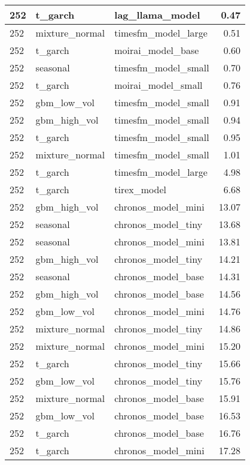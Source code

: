 {\begin{tabular}{lllr}
\midrule
252 & t\_garch & lag\_llama\_model & 0.47 \\
\midrule
252 & mixture\_normal & timesfm\_model\_large & 0.51 \\
\midrule
252 & t\_garch & moirai\_model\_base & 0.60 \\
\midrule
252 & seasonal & timesfm\_model\_small & 0.70 \\
\midrule
252 & t\_garch & moirai\_model\_small & 0.76 \\
\midrule
252 & gbm\_low\_vol & timesfm\_model\_small & 0.91 \\
\midrule
252 & gbm\_high\_vol & timesfm\_model\_small & 0.94 \\
\midrule
252 & t\_garch & timesfm\_model\_small & 0.95 \\
\midrule
252 & mixture\_normal & timesfm\_model\_small & 1.01 \\
\midrule
252 & t\_garch & timesfm\_model\_large & 4.98 \\
\midrule
252 & t\_garch & tirex\_model & 6.68 \\
\midrule
252 & gbm\_high\_vol & chronos\_model\_mini & 13.07 \\
\midrule
252 & seasonal & chronos\_model\_tiny & 13.68 \\
\midrule
252 & seasonal & chronos\_model\_mini & 13.81 \\
\midrule
252 & gbm\_high\_vol & chronos\_model\_tiny & 14.21 \\
\midrule
252 & seasonal & chronos\_model\_base & 14.31 \\
\midrule
252 & gbm\_high\_vol & chronos\_model\_base & 14.56 \\
\midrule
252 & gbm\_low\_vol & chronos\_model\_mini & 14.76 \\
\midrule
252 & mixture\_normal & chronos\_model\_tiny & 14.86 \\
\midrule
252 & mixture\_normal & chronos\_model\_mini & 15.20 \\
\midrule
252 & t\_garch & chronos\_model\_tiny & 15.66 \\
\midrule
252 & gbm\_low\_vol & chronos\_model\_tiny & 15.76 \\
\midrule
252 & mixture\_normal & chronos\_model\_base & 15.91 \\
\midrule
252 & gbm\_low\_vol & chronos\_model\_base & 16.53 \\
\midrule
252 & t\_garch & chronos\_model\_base & 16.76 \\
\midrule
252 & t\_garch & chronos\_model\_mini & 17.28 \\
\bottomrule
\end{tabular}
}